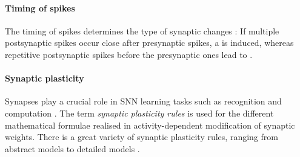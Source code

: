 \vspace{-3mm}
\paragraph{\textbf{Timing of spikes}}
The timing of spikes determines the type of synaptic changes \cite{LTP_D_bio}:
If multiple postsynaptic spikes occur close after presynaptic spikes, a  is induced, 
whereas repetitive postsynaptic spikes before the presynaptic ones lead to .

\vspace{-3mm}
\paragraph{\textbf{Synaptic plasticity}}
Synapses play a crucial role in \ac{SNN} learning tasks such as recognition and computation \cite{Synaptic_plasticity}.
The term \textit{synaptic plasticity rules} is used for the different mathematical formulae realised in activity-dependent modification of synaptic weights.
There is a great variety of synaptic plasticity rules, ranging from abstract models to detailed models \cite{Synaptic_plasticity}.

